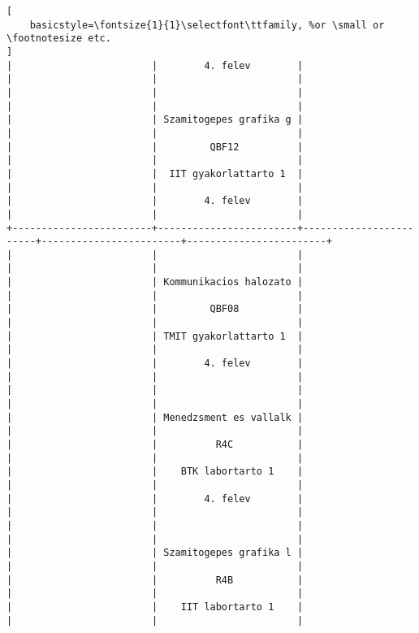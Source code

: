 \begin{lstlisting}[
    basicstyle=\fontsize{1}{1}\selectfont\ttfamily, %or \small or \footnotesize etc.
]
|                        |        4. felev        |                        |                        |                        | 
|                        |                        |                        |                        |                        | 
|                        | Szamitogepes grafika g |                        |                        |                        | 
|                        |         QBF12          |                        |                        |                        | 
|                        |  IIT gyakorlattarto 1  |                        |                        |                        | 
|                        |        4. felev        |                        |                        |                        | 
+------------------------+------------------------+------------------------+------------------------+------------------------+
|                        |                        |                        |                        |                        | 
|                        | Kommunikacios halozato |                        |                        |                        | 
|                        |         QBF08          |                        |                        |                        | 
|                        | TMIT gyakorlattarto 1  |                        |                        |                        | 
|                        |        4. felev        |                        |                        |                        | 
|                        |                        |                        |                        |                        | 
|                        | Menedzsment es vallalk |                        |                        |                        | 
|                        |          R4C           |                        |                        |                        | 
|                        |    BTK labortarto 1    |                        |                        |                        | 
|                        |        4. felev        |                        |                        |                        | 
|                        |                        |                        |                        |                        | 
|                        | Szamitogepes grafika l |                        |                        |                        | 
|                        |          R4B           |                        |                        |                        | 
|                        |    IIT labortarto 1    |                        |                        |                        | 

\end{lstlisting}
